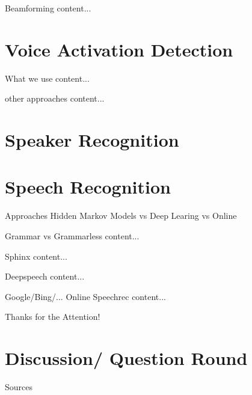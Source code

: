 \documentclass{beamer}
\begin{document}
	\begin{frame}{Beamforming}
		content...
	\end{frame}
	
	\section{Voice Activation Detection}%
	
	\begin{frame}{What we use}
		content...
	\end{frame}
	
	\begin{frame}{other approaches}
		content...
	\end{frame}
	
	\section{Speaker Recognition}%
	
	\section{Speech Recognition}%
	
	\begin{frame}{Approaches}
		Hidden Markov Models
		vs
		Deep Learing
		vs 
		Online
	\end{frame}
	
	\begin{frame}{Grammar vs Grammarless}
		content...
	\end{frame}
	
	\begin{frame}{Sphinx}
		content...
	\end{frame}
	
	\begin{frame}{Deepspeech}
		content...
	\end{frame}
	
	\begin{frame}{Google/Bing/... Online Speechrec}
		content...
	\end{frame}
	
	
	\begin{frame}{}
		Thanks for the Attention!
	\end{frame}
	
	\section{Discussion/ Question Round}%
	
	\begin{frame}{Sources}
		
		
	\end{frame}
	
\end{document}
